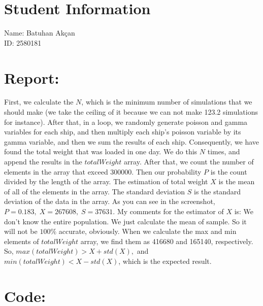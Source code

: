 \documentclass{article}
\begin{document}
\section*{Student Information}
Name: Batuhan Akçan \\
ID: 2580181 \\

\section*{Report:}
First, we calculate the $N$, which is the minimum number of simulations that we should make (we take the ceiling of it because we can not make 123.2 simulations for instance). After that, in a loop, we randomly generate poisson and gamma variables for each ship, and then multiply each ship's poisson variable by its gamma variable, and then we sum the results of each ship. Consequently, we have found the total weight that was loaded in one day. We do this $N$ times, and append the results in the $totalWeight$ array. After that, we count the number of elements in the array that exceed 300000. Then our probability $P$ is the count divided by the length of the array. The estimation of total weight $X$ is the mean of all of the elements in the array. The standard deviation $S$ is the standard deviation of the data in the array. As you can see in the screenshot, $P=0.183,\; X=267608,\; S=37631.$ My comments for the estimator of $X$ is: We don't know the entire population. We just calculate the mean of sample. So it will not be $100\%$ accurate, obviously. When we calculate the max and min elements of $totalWeight$ array, we find them as 416680 and 165140, respectively. So, $max(totalWeight) > X + std(X),$ and $min(totalWeight) < X - std(X)$, which is the expected result.

\section*{Code:}
\end{document}

